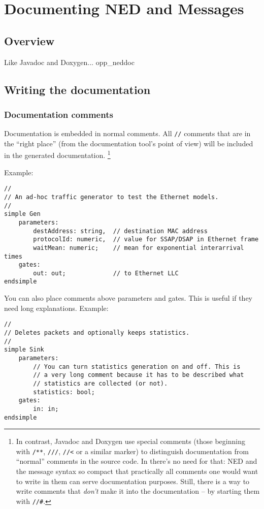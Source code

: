 \chapter{Documenting NED and Messages}
\label{cha:neddoc}

\section{Overview}

Like Javadoc and Doxygen... opp\_neddoc


\section{Writing the documentation}


\subsection{Documentation comments}

Documentation is embedded in normal comments. All \texttt{//} comments
that are in the ``right place'' (from the documentation tool's
point of view) will be included in the generated documentation.
  \footnote{In contrast, Javadoc and Doxygen use special comments (those
     beginning with \texttt{/**}, \texttt{///}, \texttt{//<} or a similar
     marker) to distinguish documentation from ``normal'' comments in the
     source code. In {\opp} there's no need for that: NED and the message
     syntax so compact that practically all comments one would want to write
     in them can serve documentation purposes. Still, there is a way to write
     comments that \textit{don't} make it into the documentation -- by starting
     them with \texttt{//\#}.}

Example:

\begin{verbatim}
//
// An ad-hoc traffic generator to test the Ethernet models.
//
simple Gen
    parameters:
        destAddress: string,  // destination MAC address
        protocolId: numeric,  // value for SSAP/DSAP in Ethernet frame
        waitMean: numeric;    // mean for exponential interarrival times
    gates:
        out: out;             // to Ethernet LLC
endsimple
\end{verbatim}

You can also place comments above parameters and gates. This is useful
if they need long explanations. Example:

\begin{verbatim}
//
// Deletes packets and optionally keeps statistics.
//
simple Sink
    parameters:
        // You can turn statistics generation on and off. This is
        // a very long comment because it has to be described what
        // statistics are collected (or not).
        statistics: bool;
    gates:
        in: in;
endsimple
\end{verbatim}

